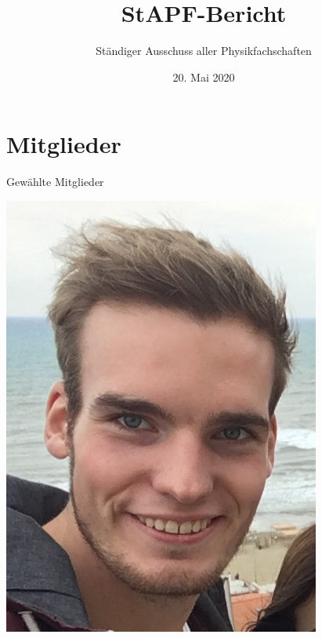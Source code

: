 \documentclass[compress, aspectratio=169]{beamer}
\title[StAPf-Bericht]{StAPF-Bericht}
\author{Ständiger Ausschuss aller Physikfachschaften}
\institute[Zusammenkunft aller Physikfachschaften]
\date{20. Mai 2020}
\begin{document}
\begin{frame}[plain]{}
  \titlepage
\end{frame}

\section{Mitglieder}

\begin{frame}{Gewählte Mitglieder}
  \begin{minipage}{.32\textwidth}
    \centering
    \includegraphics[height=0.25\textheight]{chris.jpeg}
  \end{minipage}
  \begin{minipage}{.32\textwidth}
    \centering

\end{minipage}
\end{frame}
\end{document}
